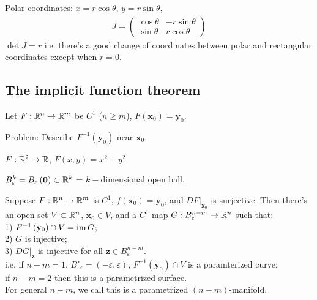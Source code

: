 \documentclass[a4paper]{article}
\begin{document}
\begin{eg}
Polar coordinates: $x=r\cos \theta$, $y=r\sin\theta$,
\begin{equation*}
\begin{aligned}
J=\left(\begin{matrix}
\cos\theta & -r\sin\theta\\
\sin\theta & r\cos\theta
\end{matrix}
\right)
\end{aligned}
\end{equation*}
$\det J = r$ i.e. there's a good change of coordinates between polar and rectangular coordinates except when $r=0$.
\end{eg}

\subsection{The implicit function theorem}
Let $F:\mathbb{R}^n \to \mathbb{R}^m$ be $C^1$ ($n \geq m$), $F\left(\mathbf{x}_0\right) = \mathbf{y}_0$.

Problem: Describe $F^{-1}\left(\mathbf{y}_0\right)$ near $\mathbf{x}_0$.

\begin{eg}
$F:\mathbb{R}^2 \to \mathbb{R}$, $F\left(x,y\right) = x^2-y^2$.


\end{eg}

\begin{notation}
$B_\varepsilon^k = B_\varepsilon\left(\mathbf{0}\right) \subset \mathbb{R}^k$ = $k-$dimensional open ball.
\end{notation}

\begin{thm}
Suppose $F:\mathbb{R}^n \to \mathbb{R}^m$ is $C^1$, $f\left(\mathbf{x}_0\right) = \mathbf{y}_0$, and $DF|_{\mathbf{x}_0}$ is surjective. Then there's an open set $V \subset \mathbb{R}^n$, $\mathbf{x}_0 \in V$, and a $C^1$ map $G: B_\varepsilon^{n-m} \to \mathbb{R}^n$ such that:\\
1) $F^{-1} \left(\mathbf{y}_0\right) \cap V = \operatorname{im} G$;\\
2) $G$ is injective;\\
3) $DG|_\mathbf{z}$ is injective for all $\mathbf{z} \in B_\varepsilon^{n-m}$.\\
i.e. if $n-m=1$, $B'_\varepsilon = \left(-\varepsilon,\varepsilon\right)$, $F^{-1}\left(\mathbf{y}_0\right) \cap V$ is a paramterized curve;\\
if $n-m = 2$ then this is a parametrized surface.\\
For general $n-m$, we call this is a parametrized $(n-m)$-manifold.
\end{thm}
\end{document}
